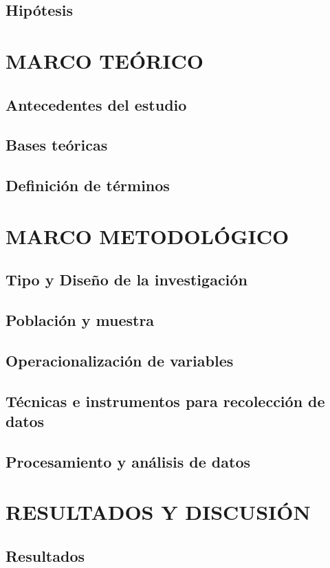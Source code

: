 \documentclass[12pt,a4paper,openany,oneside]{book}
\begin{document}
        \section{Hipótesis}

    \chapter{MARCO TEÓRICO}
        \section{Antecedentes del estudio}
        \section{Bases teóricas}
        \section{Definición de términos}

    \chapter{MARCO METODOLÓGICO}
        \section{Tipo y Diseño de la investigación}
        \section{Población y muestra}
        \section{Operacionalización de variables}
        \section{Técnicas e instrumentos para recolección de datos}
        \section{Procesamiento y análisis de datos}

    \chapter{RESULTADOS Y DISCUSIÓN}
        \section{Resultados}
\end{document}
